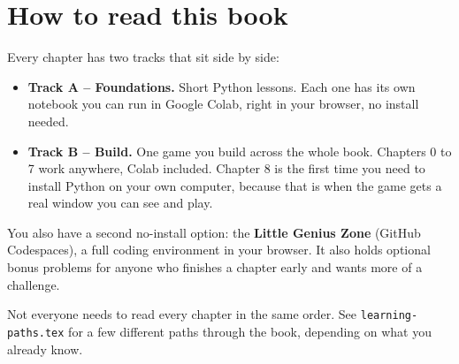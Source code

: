 \section{How to read this book}

Every chapter has two tracks that sit side by side:

\begin{itemize}
  \item \textbf{Track A -- Foundations.} Short Python lessons. Each one has
    its own notebook you can run in Google Colab, right in your browser, no
    install needed.
  \item \textbf{Track B -- Build.} One game you build across the whole
    book. Chapters 0 to 7 work anywhere, Colab included. Chapter 8 is the
    first time you need to install Python on your own computer, because
    that is when the game gets a real window you can see and play.
\end{itemize}

You also have a second no-install option: the \textbf{Little Genius Zone}
(GitHub Codespaces), a full coding environment in your browser. It also
holds optional bonus problems for anyone who finishes a chapter early and
wants more of a challenge.

Not everyone needs to read every chapter in the same order. See
\texttt{learning-paths.tex} for a few different paths through the book,
depending on what you already know.
